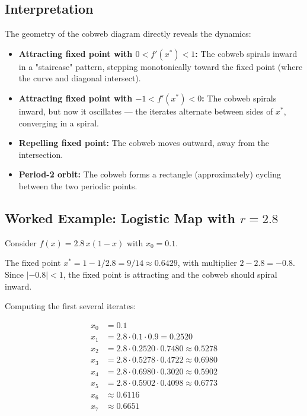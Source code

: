 \subsection{Interpretation}\label{sec:2.5.2}

The geometry of the cobweb diagram directly reveals the dynamics:

\begin{itemize}[nosep]
  \item \textbf{Attracting fixed point with $0 < f'(x^*) < 1$:} The cobweb spirals inward in a "staircase" pattern, stepping monotonically toward the fixed point (where the curve and diagonal intersect).

  \item \textbf{Attracting fixed point with $-1 < f'(x^*) < 0$:} The cobweb spirals inward, but now it oscillates --- the iterates alternate between sides of $x^*$, converging in a spiral.

  \item \textbf{Repelling fixed point:} The cobweb moves outward, away from the intersection.

  \item \textbf{Period-2 orbit:} The cobweb forms a rectangle (approximately) cycling between the two periodic points.
\end{itemize}

\subsection{Worked Example: Logistic Map with $r = 2.8$}\label{sec:2.5.3}

Consider $f(x) = 2.8\, x(1-x)$ with $x_0 = 0.1$.

The fixed point $x^* = 1 - 1/2.8 = 9/14 \approx 0.6429$, with multiplier $2 - 2.8 = -0.8$. Since $|-0.8| < 1$, the fixed point is attracting and the cobweb should spiral inward.

Computing the first several iterates:

\[
\begin{aligned}
x_0 &= 0.1 \\
x_1 &= 2.8 \cdot 0.1 \cdot 0.9 = 0.2520 \\
x_2 &= 2.8 \cdot 0.2520 \cdot 0.7480 \approx 0.5278 \\
x_3 &= 2.8 \cdot 0.5278 \cdot 0.4722 \approx 0.6980 \\
x_4 &= 2.8 \cdot 0.6980 \cdot 0.3020 \approx 0.5902 \\
x_5 &= 2.8 \cdot 0.5902 \cdot 0.4098 \approx 0.6773 \\
x_6 &\approx 0.6116 \\
x_7 &\approx 0.6651 \\
\end{aligned}
\]


